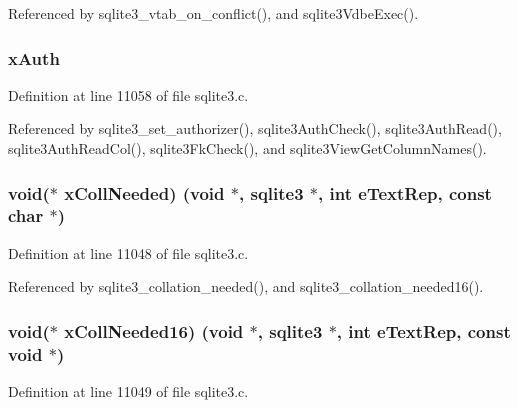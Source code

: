 Referenced by sqlite3\+\_\+vtab\+\_\+on\+\_\+conflict(), and sqlite3\+Vdbe\+Exec().

\hypertarget{structsqlite3_ae6fdf92f6a8ac2b85b63908490d15219}{}
\subsubsection[{x\+Auth}]{ x\+Auth}\label{structsqlite3_ae6fdf92f6a8ac2b85b63908490d15219}


Definition at line 11058 of file sqlite3.\+c.



Referenced by sqlite3\+\_\+set\+\_\+authorizer(), sqlite3\+Auth\+Check(), sqlite3\+Auth\+Read(), sqlite3\+Auth\+Read\+Col(), sqlite3\+Fk\+Check(), and sqlite3\+View\+Get\+Column\+Names().

\hypertarget{structsqlite3_a55e017f789c078e72e89c8170cae5a89}{}
\subsubsection[{x\+Coll\+Needed}]{\setlength{\rightskip}{0pt plus 5cm}void($\ast$ x\+Coll\+Needed) (void $\ast$, {\bf sqlite3} $\ast$, int e\+Text\+Rep, const char $\ast$)}\label{structsqlite3_a55e017f789c078e72e89c8170cae5a89}


Definition at line 11048 of file sqlite3.\+c.



Referenced by sqlite3\+\_\+collation\+\_\+needed(), and sqlite3\+\_\+collation\+\_\+needed16().

\hypertarget{structsqlite3_a4d66d7ecb511fde8e71f564ac296d7d6}{}
\subsubsection[{x\+Coll\+Needed16}]{\setlength{\rightskip}{0pt plus 5cm}void($\ast$ x\+Coll\+Needed16) (void $\ast$, {\bf sqlite3} $\ast$, int e\+Text\+Rep, const void $\ast$)}\label{structsqlite3_a4d66d7ecb511fde8e71f564ac296d7d6}


Definition at line 11049 of file sqlite3.\+c.



